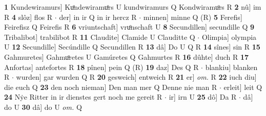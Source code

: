 \documentclass[8pt,a4paper,notitlepage]{article}
\begin{document}
\begin{table}[ht]
\begin{minipage}[t]{0.5\linewidth}
\textbf{1} Kundewiramurs] Kuͦndewiramuͦrs U kundwiramurs Q Kondwiramuͦrs R \textbf{2} nû] im R \textbf{4} slôz] flos R  $\cdot$ der] in ir Q in ir hercz R  $\cdot$ minnen] minne Q (R) \textbf{5} Ferefis] Feirefisz Q Feirefis R \textbf{6} vriuntschaft] vruͦnschaft U \textbf{8} Secundillen] secundille Q \textbf{9} Tribalibot] trabilibot R \textbf{11} Claudite] Clamide U Clauditte Q  $\cdot$ Olimpia] olympia U \textbf{12} Secundille] Secúndille Q Secundillen R \textbf{13} dâ] Do U Q R \textbf{14} sînes] sin R \textbf{15} Gahmuretes] Gahmuͦretes U Gamúretes Q Gahmurtes R \textbf{16} dûhte] duch R \textbf{17} Anfortas] antefortes R \textbf{18} pînen] pein Q (R) \textbf{19} daz] Des Q R  $\cdot$ blankiu] blanken R  $\cdot$ wurden] gar wurden Q R \textbf{20} gesweich] entweich R \textbf{21} er] \textit{om.} R \textbf{22} iuch diu] die euch Q \textbf{23} den noch nieman] Den man mer Q Denne nie man R  $\cdot$ erleit] leit Q \textbf{24} Nẏe Ritter in ir dienstes gert noch me gereit R  $\cdot$ ir] irn U \textbf{25} dô] Da R  $\cdot$ dâ] do U \textbf{30} dâ] do U \textit{om.} Q \newline
\end{minipage}
\end{table}
\end{document}
